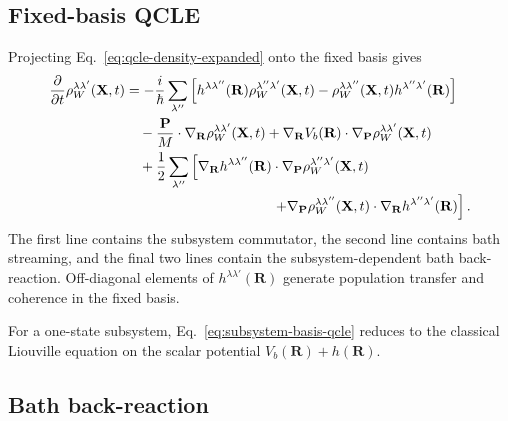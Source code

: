 \documentclass[
  11pt,
  letterpaper,
  onehalfspacing,
  normalmargins,
  equalmargins,
  oneside
]{ut-thesis}
\begin{document}
\subsection{Fixed-basis QCLE}
\label{subsec:qcle-fixed-subsystem-basis}

Projecting Eq.~\eqref{eq:qcle-density-expanded} onto the fixed basis gives
\begin{align}
\frac{\partial}{\partial t}
\rho_W^{\lambda\lambda'}(\mathbf X,t)
&=
-
\frac{i}{\hbar}
\sum_{\lambda''}
\left[
h^{\lambda\lambda''}(\mathbf R)
\rho_W^{\lambda''\lambda'}(\mathbf X,t)
-
\rho_W^{\lambda\lambda''}(\mathbf X,t)
h^{\lambda''\lambda'}(\mathbf R)
\right]
\nonumber\\
&\quad
-
\frac{\mathbf P}{M}\cdot
\nabla_{\mathbf R}
\rho_W^{\lambda\lambda'}(\mathbf X,t)
+
\nabla_{\mathbf R}V_b(\mathbf R)\cdot
\nabla_{\mathbf P}
\rho_W^{\lambda\lambda'}(\mathbf X,t)
\nonumber\\
&\quad
+
\frac{1}{2}
\sum_{\lambda''}
\left[
\nabla_{\mathbf R}h^{\lambda\lambda''}(\mathbf R)\cdot
\nabla_{\mathbf P}
\rho_W^{\lambda''\lambda'}(\mathbf X,t)
\right.
\nonumber\\
&\hspace{3.7cm}
\left.
+
\nabla_{\mathbf P}
\rho_W^{\lambda\lambda''}(\mathbf X,t)\cdot
\nabla_{\mathbf R}h^{\lambda''\lambda'}(\mathbf R)
\right].
\label{eq:subsystem-basis-qcle}
\end{align}
The first line contains the subsystem commutator, the second line contains
bath streaming, and the final two lines contain the subsystem-dependent bath
back-reaction. Off-diagonal elements of
\(h^{\lambda\lambda'}(\mathbf R)\) generate population transfer and
coherence in the fixed basis.

For a one-state subsystem, Eq.~\eqref{eq:subsystem-basis-qcle} reduces to the
classical Liouville equation on the scalar potential
\(V_b(\mathbf R)+h(\mathbf R)\).


\subsection{Bath back-reaction}
\label{subsec:subsystem-density-back-reaction}
\end{document}
